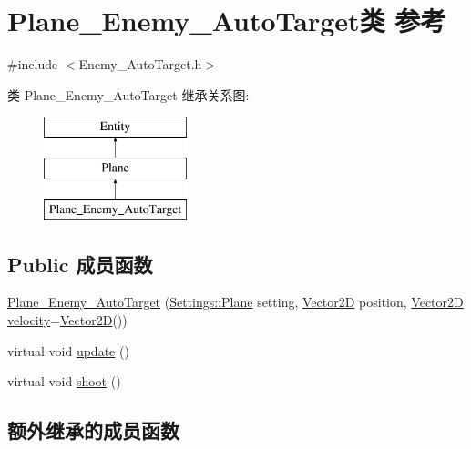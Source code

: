 \hypertarget{class_plane___enemy___auto_target}{}\section{Plane\+\_\+\+Enemy\+\_\+\+Auto\+Target类 参考}
\label{class_plane___enemy___auto_target}


{\ttfamily \#include $<$Enemy\+\_\+\+Auto\+Target.\+h$>$}

类 Plane\+\_\+\+Enemy\+\_\+\+Auto\+Target 继承关系图\+:\begin{figure}[H]
\begin{center}
\leavevmode
\includegraphics[height=3.000000cm]{class_plane___enemy___auto_target}
\end{center}
\end{figure}
\subsection*{Public 成员函数}
\begin{DoxyCompactItemize}
\item 
\hyperlink{class_plane___enemy___auto_target_abf4224e6d4c79583016c98dc8747f3ad}{Plane\+\_\+\+Enemy\+\_\+\+Auto\+Target} (\hyperlink{struct_settings_1_1_plane}{Settings\+::\+Plane} setting, \hyperlink{_vector2_d_8hpp_aa1f1145650f1dd9bddf7335ec6434d7c}{Vector2D} position, \hyperlink{_vector2_d_8hpp_aa1f1145650f1dd9bddf7335ec6434d7c}{Vector2D} \hyperlink{class_entity_a386d25b56772b8913eb3e5adc636f6e0}{velocity}=\hyperlink{_vector2_d_8hpp_aa1f1145650f1dd9bddf7335ec6434d7c}{Vector2D}())
\item 
virtual void \hyperlink{class_plane___enemy___auto_target_acae2a6f38bdc71d17188e2b7711f4d5b}{update} ()
\item 
virtual void \hyperlink{class_plane___enemy___auto_target_a002ba5754abc49b37ab3131f1a8f48c7}{shoot} ()
\end{DoxyCompactItemize}
\subsection*{额外继承的成员函数}


